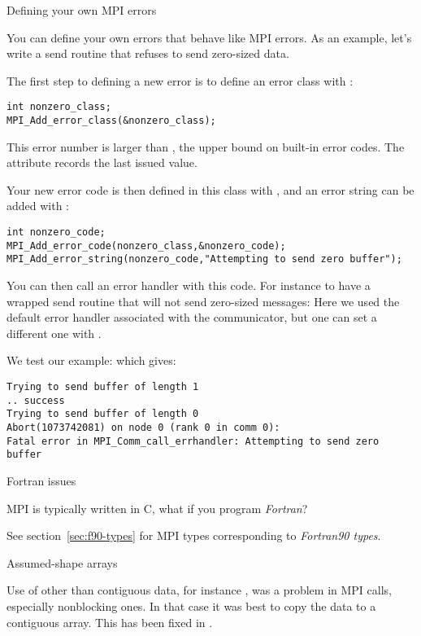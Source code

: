  {Defining your own MPI errors}

You can define your own errors that behave like MPI errors.
As an example, let's write a send routine that refuses to send
zero-sized data.

The first step to defining a new error is
to define an error class with :
\begin{lstlisting}
int nonzero_class;
MPI_Add_error_class(&nonzero_class);
\end{lstlisting}
This error number is larger than ,
the upper bound on built-in error codes.
The attribute  records the last issued value.

Your new error code is then defined in this class 
with ,
and an error string can be added with :
\begin{lstlisting}
int nonzero_code;
MPI_Add_error_code(nonzero_class,&nonzero_code);
MPI_Add_error_string(nonzero_code,"Attempting to send zero buffer");
\end{lstlisting}

You can then call an error handler with this code.
For instance to have a wrapped send routine that will not send zero-sized messages:
%
%
Here we used the default error handler associated with the communicator,
but one can set a different one with .

We test our example:
%
%
which gives:
\begin{verbatim}
Trying to send buffer of length 1
.. success
Trying to send buffer of length 0
Abort(1073742081) on node 0 (rank 0 in comm 0):
Fatal error in MPI_Comm_call_errhandler: Attempting to send zero buffer
\end{verbatim}

 {Fortran issues}
\label{sec:mpi-fortran}

MPI is typically written in C, what if you program \emph{Fortran}?

See section~\ref{sec:f90-types} for MPI types corresponding to
\emph{Fortran90 types}.

 {Assumed-shape arrays}
\label{sec:mpif-shape}

Use of other than contiguous data, for instance , was a
problem in MPI calls, especially nonblocking ones. In that case it
was best to copy the data to a contiguous array. This has been fixed
in .


